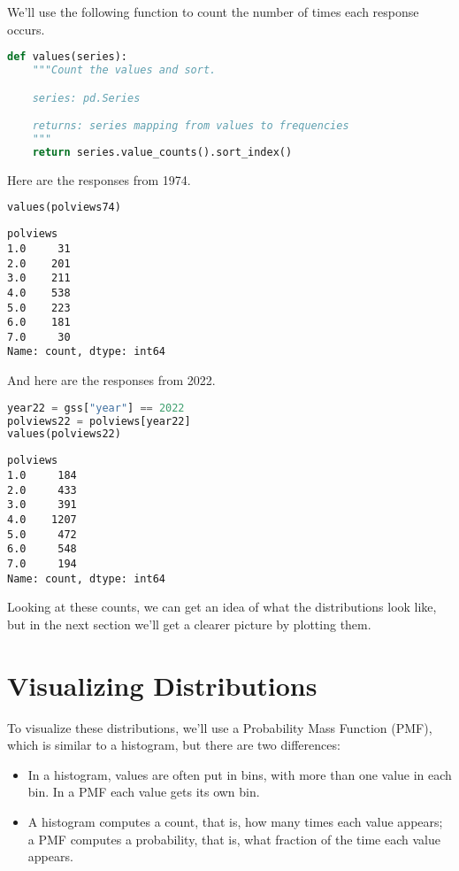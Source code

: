 We'll use the following function to count the number of times each
response occurs.

\begin{lstlisting}[language=Python,style=source]
def values(series):
    """Count the values and sort.

    series: pd.Series

    returns: series mapping from values to frequencies
    """
    return series.value_counts().sort_index()
\end{lstlisting}

Here are the responses from 1974.

\begin{lstlisting}[language=Python,style=source]
values(polviews74)
\end{lstlisting}

\begin{lstlisting}[style=output]
polviews
1.0     31
2.0    201
3.0    211
4.0    538
5.0    223
6.0    181
7.0     30
Name: count, dtype: int64
\end{lstlisting}

And here are the responses from 2022.

\begin{lstlisting}[language=Python,style=source]
year22 = gss["year"] == 2022
polviews22 = polviews[year22]
values(polviews22)
\end{lstlisting}

\begin{lstlisting}[style=output]
polviews
1.0     184
2.0     433
3.0     391
4.0    1207
5.0     472
6.0     548
7.0     194
Name: count, dtype: int64
\end{lstlisting}

Looking at these counts, we can get an idea of what the distributions
look like, but in the next section we'll get a clearer picture by
plotting them.

\section{Visualizing Distributions}\label{visualizing-distributions}

To visualize these distributions, we'll use a Probability Mass Function
(PMF), which is similar to a histogram, but there are two differences:

\begin{itemize}
\item
  In a histogram, values are often put in bins, with more than one value
  in each bin. In a PMF each value gets its own bin.
\item
  A histogram computes a count, that is, how many times each value
  appears; a PMF computes a probability, that is, what fraction of the
  time each value appears.
\end{itemize}

